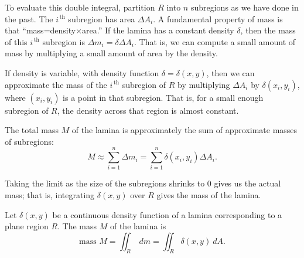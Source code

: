 To evaluate this double integral, partition $R$ into $n$ subregions as we have done in the past. The $i^{\,\text{th}}$ subregion has area $\Delta A_i$. 
A fundamental property of mass is that ``mass=density$\times$area.'' If the lamina has a constant density $\delta$, then the mass of this $i^{\,\text{th}}$ subregion is $\Delta m_i=\delta\Delta A_i$. %
That is, we can compute a small amount of mass by multiplying a small amount of area by the density.

If density is variable, with density function $\delta= \delta(x,y)$, then we can approximate the mass of the $i^{\,\text{th}}$ subregion of $R$ by multiplying $\Delta A_i$ by $\delta(x_i,y_i)$, where $(x_i,y_i)$ is a point in that subregion. That is, for a small enough subregion of $R$, the density across that region is almost constant. 


The total mass $M$ of the lamina is approximately the sum of approximate masses of subregions:
$$M \approx \sum_{i=1}^n \Delta m_i = \sum_{i=1}^n \delta(x_i,y_i)\Delta A_i.$$

Taking the limit as the size of the subregions shrinks to 0 gives us the actual mass; that is, integrating $\delta(x,y)$ over $R$ gives the mass of the lamina.

{Let $\delta(x,y)$ be a continuous density function of a lamina corresponding to a plane region $R$. The mass $M$ of the lamina is
\[\text{mass } M = \iint_R\ dm = \iint_R \delta(x,y)\ dA.\]}


